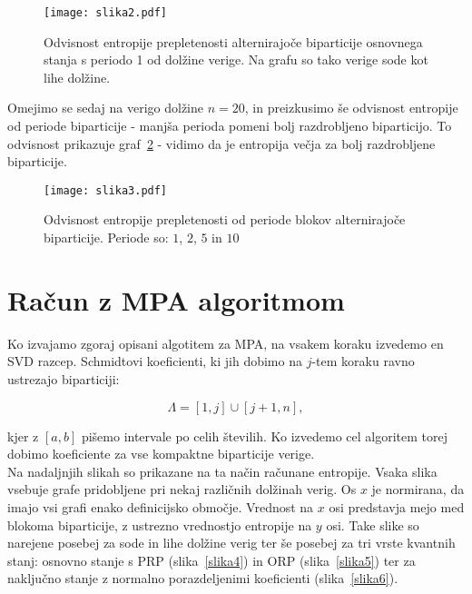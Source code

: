 \documentclass[a4paper]{article}
\begin{document}
    \begin{figure}
        \centering
        \texttt{[image: slika2.pdf]}
        \caption{Odvisnost entropije prepletenosti alternirajoče biparticije osnovnega stanja s periodo 1 od dolžine verige. Na grafu so tako
        verige sode kot lihe dolžine.}
        \label{slika2}
    \end{figure}

    Omejimo se sedaj na verigo dolžine $n = 20$, in preizkusimo še odvisnost entropije od periode biparticije - manjša perioda pomeni bolj
    razdrobljeno biparticijo. To odvisnost prikazuje graf~\ref{slika3} - vidimo da je entropija večja za bolj razdrobljene biparticije.

    \begin{figure}
        \centering
        \texttt{[image: slika3.pdf]}
        \caption{Odvisnost entropije prepletenosti od periode blokov alternirajoče biparticije. Periode so: $1$, $2$, $5$ in $10$}
        \label{slika3}
    \end{figure}

    \section{Račun z MPA algoritmom}

    Ko izvajamo zgoraj opisani algotitem za MPA, na vsakem koraku izvedemo en SVD razcep. Schmidtovi koeficienti, ki jih  dobimo na $j$-tem koraku
    ravno ustrezajo biparticiji:
 
    \begin{equation}\label{eq20}
        \Lambda = [1, j] \cup [j+1, n],
    \end{equation}

    kjer z $[a, b]$ pišemo intervale po celih številih. Ko izvedemo cel algoritem torej dobimo koeficiente za vse kompaktne biparticije verige. \\

    Na nadaljnjih slikah so prikazane na ta način računane entropije. Vsaka slika vsebuje grafe pridobljene pri nekaj različnih dolžinah verig.
    Os $x$ je normirana, da imajo vsi grafi enako definicijsko območje. Vrednost na $x$ osi predstavja mejo med blokoma biparticije, z ustrezno 
    vrednostjo entropije na $y$ osi. Take slike so narejene posebej za sode in lihe dolžine verig ter še posebej za tri vrste kvantnih stanj:
    osnovno stanje s PRP (slika~\ref{slika4}) in ORP (slika~\ref{slika5}) ter za naključno stanje z normalno porazdeljenimi koeficienti
    (slika~\ref{slika6}). \\
\end{document}

